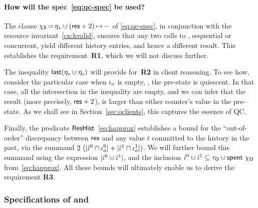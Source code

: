 \paragraph{How will the spec~\eqref{eq:qc-spec} be used?}

The clause $\hists\,{=}\,\gists \hunion (\res+2)\,{\mapsto}\,-$ of
\eqref{eq:qc-spec}, in conjunction with the resource
invariant~\ref{cn:hvalid}, ensures that any two calls to
, sequential or concurrent, yield different history
entries, and hence a different result. This establishes the
requirement~\textbf{R1}, which we will not discuss further.

The inequality $\mathsf{last}(\gists \hunion \gisto)$ will provide
for~\textbf{R2} in client reasoning. To see how, consider the
particular case when $\iota_o$ is empty, \ie, the pre-state is
quiescent. In that case, all the intersection in the inequality are
empty, and we can infer that the result (more precisely, $\mathsf{res} + 2$),
is larger than either counter's value in the pre-state. As we shall
see in Section~\ref{sec:qclients}, this captures the essence of QC.

Finally, the predicate $\mathsf{ResHist}$~\eqref{eq:happrox} establishes a
bound for the ``out-of-order'' discrepancy between $\mathsf{res}$ and any
value $t$ committed to the history in the past, via the summand
$2\ (|\hat{\iota}^0 \cap \iota_o^0| + |\hat{\iota}^1 \cap \iota_o^1|)$. We will further
bound this summand using the expression $|\iknh^0 \hunion \iknh^1|$,
and the inclusion $\iknh^0 \hunion \iknh^1 \subseteq \tkno \hunion
\Tomb~\histo$ from~\eqref{eq:happrox}. All these bounds will
ultimately enable us to derive the requirement \textbf{R3}.
%

\subsubsection{Specifications of {} and
  {}}
\label{sec:qacts}

